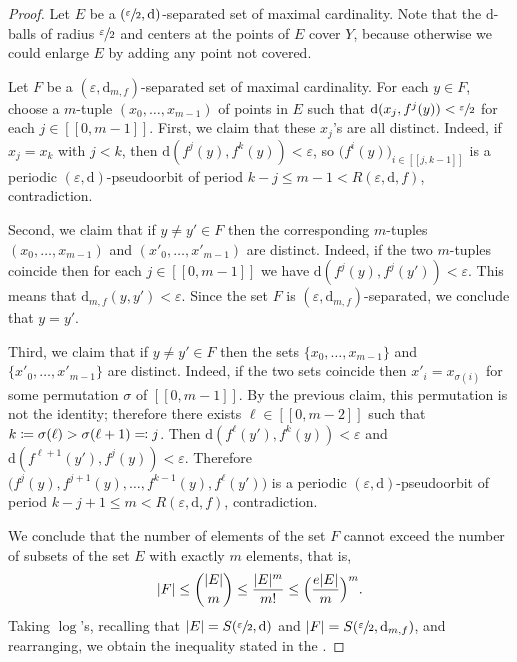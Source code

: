 \documentclass[10pt]{amsart}
\newcommand{\ldbrack}{[\![}
\newcommand{\rdbrack}{]\!]}
\def\vcentcolon{\mathrel{\mathop\ordinarycolon}}
\providecommand\ordinarycolon{:}
\providecommand*\coloneqq{\vcentcolon\mathrel{\mkern-1.2mu}=}
\providecommand*\eqqcolon{=\mathrel{\mkern-1.2mu}\vcentcolon}
\let\eqcolon\eqqcolon
\theoremstyle{plain}
\theoremstyle{definition}
\newcommand{\dd}{\mathrm{d}}
\let\epsilon\varepsilon
\begin{document}
\begin{proof}	
Let $E$ be a $(\sfrac{\epsilon}{2},\dd)$-separated set of maximal cardinality.
Note that the $\dd$-balls of radius $\sfrac{\epsilon}{2}$ and centers at the points of $E$ cover $Y$, because otherwise we could enlarge $E$ by adding any point not covered.

Let $F$ be a $(\epsilon,\dd_{m,f})$-separated set of maximal cardinality.
For each $y \in F$, choose a $m$-tuple $(x_0, \dots, x_{m-1})$ of points in $E$ such that $\dd(x_j, f^j(y)) < \sfrac{\epsilon}{2}$ for each $j \in \ldbrack 0, m-1 \rdbrack$.
First, we claim that these $x_j$'s are all distinct. Indeed, if $x_j = x_k$ with $j < k$, then $\dd(f^j(y), f^k(y)) < \epsilon$, so $\big( f^i(y) \big)_{i \in \ldbrack j, k-1 \rdbrack}$ is a periodic $(\epsilon,\dd)$-pseudoorbit of period $k-j \le m-1 < R(\epsilon,\dd,f)$, contradiction.

Second, we claim that if $y \neq y' \in F$ then the corresponding $m$-tuples $(x_0, \dots, x_{m-1})$ and $(x'_0, \dots, x'_{m-1})$ are distinct.
Indeed, if the two $m$-tuples coincide then for each $j \in \ldbrack 0, m-1\rdbrack$ we have $\dd(f^j(y), f^j(y')) < \epsilon$. This means that $\dd_{m,f}(y,y') < \epsilon$. Since the set $F$ is $(\epsilon,\dd_{m,f})$-separated, we conclude that $y=y'$.

Third, we claim that if $y \neq y' \in F$ then the sets $\{x_0, \dots, x_{m-1}\}$ and $\{x'_0, \dots, x'_{m-1}\}$ are distinct.
Indeed, if the two sets coincide then $x'_i = x_{\sigma(i)}$ for some permutation $\sigma$ of $\ldbrack 0, m-1\rdbrack$.
By the previous claim, this permutation is not the identity; therefore there exists $\ell \in \ldbrack 0, m-2\rdbrack$ such that $k \coloneqq \sigma(\ell) > \sigma(\ell+1) \eqcolon j$. Then $\dd(f^{\ell}(y'), f^{k}(y)) < \epsilon$ and $\dd(f^{\ell+1}(y'), f^{j}(y)) < \epsilon$.
Therefore $\big(f^{j}(y), f^{j+1}(y), \dots, f^{k-1}(y), f^{\ell}(y') \big)$
is a periodic $(\epsilon,\dd)$-pseudoorbit of period $k-j+1 \le m < R(\epsilon,\dd,f)$, contradiction.

We conclude that the number of elements of the set $F$ cannot exceed the number of subsets of the set $E$ with exactly $m$ elements, that is,
\[
|F| \le \binom{|E|}{m} \le \frac{|E|^m}{m!} \le \Bigl( \frac{e |E|}{m} \Bigr)^m.
\]
Taking $\log$'s, recalling that $|E| = S(\sfrac{\epsilon}{2},\dd)$ and $|F| = S(\sfrac{\epsilon}{2},\dd_{m,f})$, and rearranging, we obtain the inequality stated in the .
\end{proof}
\end{document}
